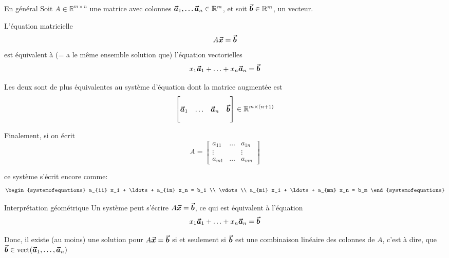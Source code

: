\documentclass{article}
\begin{document}
\begin{parag}{En général}
    Soit $A \in \mathbb{R}^{m \times n}$ une matrice avec colonnes $\bm{\protect\vec{a}}_1, \ldots \bm{\protect\vec{a}}_n \in \mathbb{R}^{m}$, et soit $\bm{\protect\vec{b}} \in \mathbb{R}^m$, un vecteur.

    L'équation matricielle
    \[A \bm{\protect\vec{x}} = \bm{\protect\vec{b}}\]
    est équivalent à (= a le même ensemble solution que) l'équation vectorielles
    \[x_1 \bm{\protect\vec{a}}_1 + \ldots + x_n \bm{\protect\vec{a}}_n = \bm{\protect\vec{b}}\]

    Les deux sont de plus équivalentes au système d'équation dont la matrice augmentée est
    \[\begin{bmatrix}  &  &  &  \\ \bvec{a}_1 & \ldots & \bvec{a}_n & \bvec{b} \\  &  &  &  \end{bmatrix} \in \mathbb{R}^{m \times \left(n+1\right)}
        \]

    Finalement, si on écrit
    \[A = \begin{bmatrix} a_{11} & \ldots & a_{1n} \\ \vdots &  & \vdots \\ a_{m1} & \ldots & a_{mn} \end{bmatrix} \]

    ce système s'écrit encore comme:
    \[\begin{systemofequations}
    a_{11} x_1 + \ldots + a_{1n} x_n = b_1  \\
    \vdots \\
    a_{m1} x_1 + \ldots + a_{mn} x_n = b_m
    \end{systemofequations}\]
\end{parag}

\begin{parag}{Interprétation géométrique}
    Un système peut s'écrire $A \bm{\protect\vec{x}} = \bm{\protect\vec{b}}$, ce qui est équivalent à l'équation
    \[x_1 \bm{\protect\vec{a}}_1 + \ldots + x_n \bm{\protect\vec{a}}_n = \bm{\protect\vec{b}}\]

    Donc, il existe (au moins) une solution pour $A \bm{\protect\vec{x}} =  \bm{\protect\vec{b}}$ si et seulement si $\bm{\protect\vec{b}}$ est une combinaison linéaire des colonnes de $A$, c'est à dire, que $\bvec{b} \in \vect\left(\bvec{a}_1, \ldots, \bvec{a}_n\right)$
\end{parag}
\end{document}
